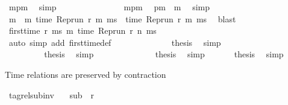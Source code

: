 \begin{isabellebody}
\ mpm\ \isamarkupfalse%
\ simp\isanewline
\ \ \ \ \ \ \ \ \ \ \ \ \isamarkupfalse%
\ \isamarkupfalse%
\ mpm\ \isamarkupfalse%
\ {\isacartoucheopen}pm\ {\isacharless}\ m{\isacartoucheclose}\ \isamarkupfalse%
\ simp\isanewline
\ \ \ \ \ \ \ \ \ \ \ \ \isamarkupfalse%
\ \isamarkupfalse%
\ {\isacartoucheopen}{\isasymexists}m{\isacharprime}\ {\isacharless}\ m{\isachardot}\ time\ {\isacharparenleft}Rep{\isacharunderscore}run\ r\ m{\isacharprime}\ ms{\isacharparenright}\ {\isacharequal}\ time\ {\isacharparenleft}Rep{\isacharunderscore}run\ r\ m\ ms{\isacharparenright}{\isacartoucheclose}\ \isamarkupfalse%
\ blast\isanewline
\ \ \ \ \ \ \ \ \ \ \ \ \isamarkupfalse%
\ {\isacartoucheopen}{\isasymnot}{\isacharparenleft}first{\isacharunderscore}time\ r\ ms\ m\ {\isacharparenleft}time\ {\isacharparenleft}Rep{\isacharunderscore}run\ r\ n\ ms{\isacharparenright}\ {\isacharplus}\ {\isasymdelta}{\isasymtau}{\isacharparenright}{\isacharparenright}{\isacartoucheclose}\isanewline
\ \ \ \ \ \ \ \ \ \ \ \ \ \ \isamarkupfalse%
\ {\isacharparenleft}auto\ simp\ add{\isacharcolon}\ first{\isacharunderscore}time{\isacharunderscore}def{\isacharparenright}\isanewline
\ \ \ \ \ \ \ \ \ \ \ \ \isamarkupfalse%
\ {\isacharquery}thesis\ \isamarkupfalse%
\ simp\isanewline
\ \ \ \ \ \ \ \ \ \ \isamarkupfalse%
\isanewline
\ \ \ \ \ \ \ \ \isamarkupfalse%
\isanewline
\ \ \ \ \ \ \isacommand{{\isacharbraceright}}\isamarkupfalse%
\ \isamarkupfalse%
\ {\isacharquery}thesis\ \isamarkupfalse%
\ simp\isanewline
\ \ \ \ \ \ \isamarkupfalse%
\isanewline
\ \ \ \ \isacommand{{\isacharbraceright}}\isamarkupfalse%
\ \isamarkupfalse%
\ {\isacharquery}thesis\ \isamarkupfalse%
\ simp\isanewline
\ \ \isamarkupfalse%
\isanewline
\ \ \isamarkupfalse%
\ {\isacharquery}thesis\ \isamarkupfalse%
\ simp\isanewline
{}\isamarkupfalse%
%
\endisatagproof
{\isafoldproof}%
%
\isadelimproof
%
\endisadelimproof
%
\begin{isamarkuptext}%
Time relations are preserved by contraction%
\end{isamarkuptext}\isamarkuptrue%
\isamarkupfalse%
\ tagrel{\isacharunderscore}sub{\isacharunderscore}inv{\isacharcolon}\isanewline
\ \ \ {\isacartoucheopen}sub\ {\isasymlless}\ r{\isacartoucheclose}\isanewline

\end{isabellebody}
